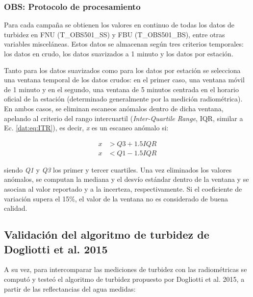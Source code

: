         
        \subsubsection{OBS: Protocolo de procesamiento}
        \label{dat:s:obsProc}
        
            Para cada campaña se obtienen los valores en continuo de todas los datos de turbidez en FNU (T\_OBS501\_SS) y FBU (T\_OBS501\_BS), entre otras variables misceláneas. Estos datos se almacenan según tres criterios temporales: los datos en crudo, los datos suavizados a 1 minuto y los datos por estación.
            
            Tanto para los datos suavizados como para los datos por estación se selecciona una ventana temporal de los datos crudos: en el primer caso, una ventana móvil de 1 minuto y en el segundo, una ventana de 5 minutos centrada en el horario oficial de la estación (determinado generalmente por la medición radiométrica). En ambos casos, se eliminan escaneos anómalos dentro de dicha ventana, apelando al criterio del rango intercuartil (\textit{Inter-Quartile Range}, IQR, similar a Ec. \ref{dat:eq:ITR}), es decir, \textit{x} es un escaneo anómalo si:
            
            \begin{equation}
                \begin{aligned}
                x &> Q3 + 1.5 IQR\\
                x &< Q1 - 1.5 IQR
                \end{aligned}    
                \label{dat:eq:IQR}
            \end{equation}

            \noindent 
            siendo \textit{Q1} y \textit{Q3} los primer y tercer cuartiles. Una vez eliminados los valores anómalos, se computan la mediana y el desvío estándar dentro de la ventana y se asocian al valor reportado y a la incerteza, respectivamente. Si el coeficiente de variación supera el 15\%, el valor de la ventana no es considerado de buena calidad.

    \subsection{Validación del algoritmo de turbidez de Dogliotti et al. 2015}
    \label{dat:s:dog15}

        A su vez, para intercomparar las mediciones de turbidez con las radiométricas se computó y testeó el algoritmo de turbidez propuesto por Dogliotti et al. 2015, \cite{dogliotti2015} a partir de las reflectancias del agua medidas:

